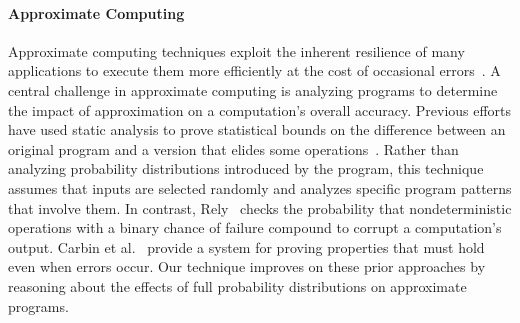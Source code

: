 \paragraph{Approximate Computing}
Approximate computing techniques exploit the inherent resilience of many
applications to execute them more efficiently at the cost of occasional
errors~\cite{enerj, npu, rely, perforation}.
A central challenge in approximate computing is analyzing programs to
determine the impact of approximation on a computation's overall accuracy.
Previous efforts have used static analysis to prove statistical bounds on the
difference between an original program and a version that elides some
operations~\cite{sasa-sas,zhu-popl}.
Rather than analyzing probability distributions introduced by the program, this technique assumes
that inputs are selected randomly and analyzes specific program patterns that
involve them.
In contrast, Rely~\cite{rely} checks the probability that nondeterministic
operations with a binary chance of failure compound to corrupt a computation's
output.
Carbin et al.~\cite{carbin-pldi} provide a system for proving properties that
must hold even when errors occur.
Our technique improves on these prior approaches by reasoning about the effects of
full probability distributions on approximate programs.





